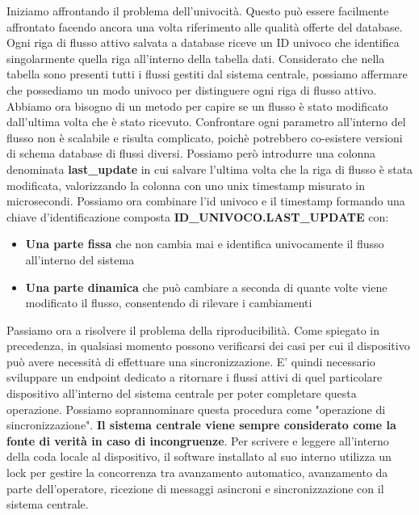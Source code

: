 \documentclass[a4paper, titlepage, 12pt, openright, twoside]{book}
\begin{document}
Iniziamo affrontando il problema dell'univocità. Questo può essere facilmente affrontato facendo ancora una volta riferimento alle qualità offerte del database. Ogni riga di flusso attivo salvata a database riceve un ID univoco che identifica singolarmente quella riga all'interno della tabella dati. Considerato che nella tabella sono presenti tutti i flussi gestiti dal sistema centrale, possiamo affermare che possediamo un modo univoco per distinguere ogni riga di flusso attivo.
\newline
Abbiamo ora bisogno di un metodo per capire se un flusso è stato modificato dall'ultima volta che è stato ricevuto. Confrontare ogni parametro all'interno del flusso non è scalabile e risulta complicato, poichè potrebbero co-esistere versioni di schema database di flussi diversi. Possiamo però introdurre una colonna denominata \textbf{last\_update} in cui salvare l'ultima volta che la riga di flusso è stata modificata, valorizzando la colonna con uno unix timestamp misurato in microsecondi.
\newline
Possiamo ora combinare l'id univoco e il timestamp formando una chiave d'identificazione composta \textbf{ID\_UNIVOCO.LAST\_UPDATE} con:
\begin{itemize}
	\item \textbf{Una parte fissa} che non cambia mai e identifica univocamente il flusso all'interno del sistema
	\item \textbf{Una parte dinamica} che può cambiare a seconda di quante volte viene modificato il flusso, consentendo di rilevare i cambiamenti
\end{itemize}
Passiamo ora a risolvere il problema della riproducibilità. Come spiegato in precedenza, in qualsiasi momento possono verificarsi dei casi per cui il dispositivo può avere necessità di effettuare una sincronizzazione. E' quindi necessario sviluppare un endpoint dedicato a ritornare i flussi attivi di quel particolare dispositivo all'interno del sistema centrale per poter completare questa operazione. Possiamo soprannominare questa procedura come "operazione di sincronizzazione". \textbf{Il sistema centrale viene sempre considerato come la fonte di verità in caso di incongruenze}. Per scrivere e leggere all'interno della coda locale al dispositivo, il software installato al suo interno utilizza un lock per gestire la concorrenza tra avanzamento automatico, avanzamento da parte dell'operatore, ricezione di messaggi asincroni e sincronizzazione con il sistema centrale.
\end{document}
